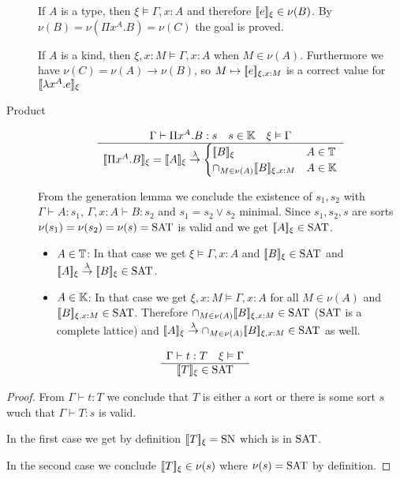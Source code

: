 \begin{definition}
\begin{description}
    If $A$ is a type, then $\xi \vDash \Gamma,x:A$ and therefore
    $[\![e]\!]_\xi \in \nu(B)$. By $\nu(B) = \nu(\Pi x^A.B) = \nu(C)$ the
    goal is proved.

    If $A$ is a kind, then $\xi,x:M \vDash \Gamma,x:A$ when $M \in
    \nu(A)$. Furthermore we have $\nu(C) = \nu(A) \to \nu(B)$, so
    $M \mapsto [\![e]\!]_{\xi,x:M}$ is a correct value for
    $[\![\lambda x^A. e]\!]_\xi$

  \item[Product]
    $$\ruleh
    {\Gamma\vdash \Pi x^A . B : s \quad s \in \Kinds \quad \xi \vDash \Gamma}
    {\typint{\Pi x^A . B}{\xi}
      =
      \typint{A}{\xi} \tolam
      \begin{cases}
        \typint{B}{\xi} & A \in \Types
        \\
        \cap_{M \in \nu(A)} \typint{B}{\xi,x:M}
        & A \in \Kinds
      \end{cases}
    }$$

    From the generation lemma we conclude the existence of $s_1,s_2$ with
    $\Gamma \vdash A:s_1$, $\Gamma,x:A \vdash B:s_2$ and
    $s_1 = s_2 \lor s_2 \text{ minimal}$. Since $s_1,s_2,s$ are sorts
    $\nu(s_1) = \nu(s_2) = \nu(s) = \text{SAT}$ is valid and we get $[\![A]\!]_\xi
    \in \text{SAT}$.

    \begin{itemize}
    \item $A \in \mathbb{T}$: In that case we get $\xi \vDash \Gamma,x:A$ and
      $[\![B]\!]_\xi \in \text{SAT}$ and
      $[\![A]\!]_\xi \stackrel{\text{$\lambda$}}{\to} [\![B]\!]_\xi \in \text{SAT}$.

    \item $A \in \mathbb{K}$: In that case we get $\xi,x:M \vDash \Gamma,x:A$ for
      all $M \in \nu(A)$ and $[\![B]\!]_{\xi,x:M} \in \text{SAT}$.
      Therefore $\cap_{M \in \nu(A)} [\![B]\!]_{\xi,x:M} \in \text{SAT}$ ($\text{SAT}$ is
      a complete lattice) and
      $[\![A]\!]_\xi \stackrel{\text{$\lambda$}}{\to} \cap_{M \in \nu(A)} [\![B]\!]_{\xi,x:M} \in
      \text{SAT}$ as well.
    \end{itemize}


  \end{description}
\end{definition}


\begin{lemma}
  $$
  \begin{array}{c} \Gamma \vdash t : T
    \quad
    \xi \vDash \Gamma
   \\ \hline [\![T]\!]_\xi \in \text{SAT}\end{array}
  $$
  \begin{proof}
    From $\Gamma \vdash t : T$ we conclude that $T$ is either a sort or there
    is some sort $s$ wuch that $\Gamma \vdash T:s$ is valid.

    In the first case we get by definition $[\![T]\!]_\xi = \text{SN}$ which is in
    $\text{SAT}$.

    In the second case we conclude $[\![T]\!]_\xi \in \nu(s)$ where $\nu(s) =
    \text{SAT}$ by definition.
  \end{proof}
\end{lemma}



